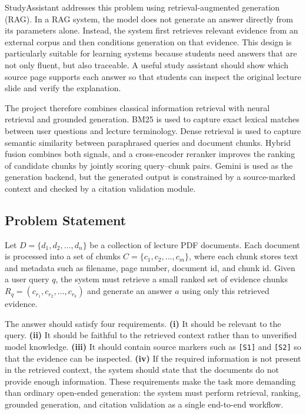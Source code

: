 \documentclass[11pt,a4paper]{article}
\begin{document}
StudyAssistant addresses this problem using retrieval-augmented generation
(RAG). In a RAG system, the model does not generate an answer directly from its
parameters alone. Instead, the system first retrieves relevant evidence from an
external corpus and then conditions generation on that evidence. This design is
particularly suitable for learning systems because students need answers that
are not only fluent, but also traceable. A useful study assistant should show
which source page supports each answer so that students can inspect the original
lecture slide and verify the explanation. 

The project therefore combines classical information retrieval with neural
retrieval and grounded generation. BM25 is used to capture exact lexical matches
between user questions and lecture terminology. Dense retrieval is used to
capture semantic similarity between paraphrased queries and document chunks.
Hybrid fusion combines both signals, and a cross-encoder reranker improves the
ranking of candidate chunks by jointly scoring query--chunk pairs. Gemini is
used as the generation backend, but the generated output is constrained by a
source-marked context and checked by a citation validation module.

\subsection{Problem Statement}

Let $D = \{d_1, d_2, \ldots, d_n\}$ be a collection of lecture PDF documents.
Each document is processed into a set of chunks
$C = \{c_1, c_2, \ldots, c_m\}$, where each chunk stores text and metadata such
as filename, page number, document id, and chunk id. Given a user query $q$, the
system must retrieve a small ranked set of evidence chunks
$R_q = (c_{r_1}, c_{r_2}, \ldots, c_{r_k})$ and generate an answer $a$ using
only this retrieved evidence.

The answer should satisfy four requirements. \textbf{(i)} It should be relevant to the
query. \textbf{(ii)} It should be faithful to the retrieved context rather than to
unverified model knowledge. \textbf{(iii)} It should contain source markers such as
\texttt{[S1]} and \texttt{[S2]} so that the evidence can be inspected. \textbf{(iv)} If the required information is not present in the retrieved context, the system
should state that the documents do not provide enough information. These
requirements make the task more demanding than ordinary open-ended generation:
the system must perform retrieval, ranking, grounded generation, and citation
validation as a single end-to-end workflow.
\end{document}
